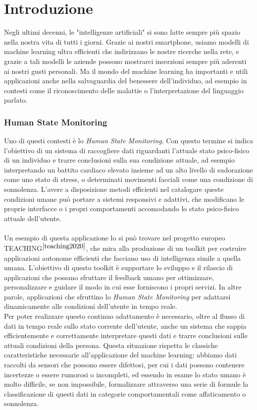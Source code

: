 \chapter*{Introduzione}

Negli ultimi decenni, le "intelligenze artificiali" si sono fatte sempre più spazio nella nostra vita di tutti i giorni. Grazie ai nostri smartphone, usiamo modelli di machine learning ultra efficienti che indirizzano le nostre ricerche nella rete, e grazie a tali modelli le aziende possono mostrarci inserzioni sempre più aderenti ai nostri gusti personali. Ma il mondo del machine learning ha importanti e utili applicazioni anche nella salvaguardia del benessere dell'individuo, ad esempio in contesti come il riconoscimento delle malattie o l'interpretazione del linguaggio parlato.

\subsection*{Human State Monitoring}
Uno di questi contesti è lo \textit{Human State Monitoring}. Con questo termine si indica l'obiettivo di un sistema di raccogliere dati riguardanti l'attuale stato psico-fisico di un individuo e trarre conclusioni sulla sua condizione attuale, ad esempio interpretando un battito cardiaco elevato insieme ad un alto livello di sudorazione come uno stato di stress, o determinati movimenti facciali come una condizione di sonnolenza. L'avere a disposizione metodi efficienti nel catalogare queste condizioni umane può portare a sistemi responsivi e adattivi, che modificano le proprie interfacce o i propri comportamenti accomodando lo stato psico-fisico attuale dell'utente.\\\\
Un esempio di questa applicazione lo si può trovare nel progetto europeo\\TEACHING$^{\cite{teaching2020}}$, che mira alla produzione di un toolkit per costruire applicazioni autonome efficienti che facciano uso di intelligenza simile a quella umana. L'obiettivo di questo toolkit è supportare lo sviluppo e il rilascio di applicazioni che possano sfruttare il feedback umano per ottimizzare, personalizzare e guidare il modo in cui esse forniscono i propri servizi. In altre parole, applicazioni che sfruttino lo \textit{Human State Monitoring} per adattarsi dinamicamente alle condizioni dell'utente in tempo reale.\\
Per poter realizzare questo continuo adattamento è necessario, oltre al flusso di dati in tempo reale sullo stato corrente dell'utente, anche un sistema che sappia efficientemente e correttamente interpretare questi dati e trarre conclusioni sulle attuali condizioni della persona. Questa situazione rispetta le classiche caratteristiche necessarie all'applicazione del machine learning: abbiamo dati raccolti da sensori che possono essere difettosi, per cui i dati possono contenere incertezze o essere rumorosi o incompleti, ed essendo in esame lo stato umano è molto difficile, se non impossibile, formalizzare attraverso una serie di formule la classificazione di questi dati in categorie comportamentali come affaticamento o sonnolenza.

